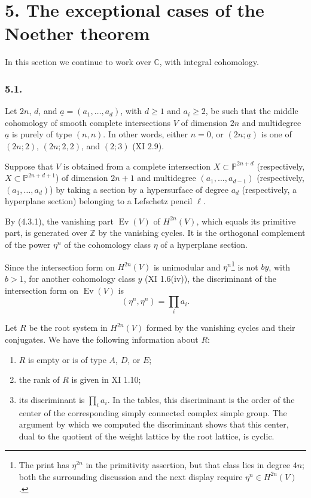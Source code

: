 \section*{5. The exceptional cases of the Noether theorem}

In this section we continue to work over $\mathbb C$, with integral
cohomology.

\subsubsection*{5.1.}
Let $2n$, $d$, and $\underline a=(a_1,\ldots,a_d)$, with $d\geq1$ and
$a_i\geq2$, be such that the middle cohomology of smooth complete
intersections $V$ of dimension $2n$ and multidegree $\underline a$ is
purely of type $(n,n)$.  In other words, either $n=0$, or
$(2n;\underline a)$ is one of $(2n;2)$, $(2n;2,2)$, and $(2;3)$
(XI 2.9).

Suppose that $V$ is obtained from a complete intersection
$X\subset\mathbb P^{2n+d}$ (respectively,
$X\subset\mathbb P^{2n+d+1}$) of dimension $2n+1$ and multidegree
$(a_1,\ldots,a_{d-1})$ (respectively, $(a_1,\ldots,a_d)$) by taking a
section by a hypersurface of degree $a_d$ (respectively, a hyperplane
section) belonging to a Lefschetz pencil $\ell$.

By (4.3.1), the vanishing part $\operatorname{Ev}(V)$ of $H^{2n}(V)$,
which equals its primitive part, is generated over $\mathbb Z$ by the
vanishing cycles.  It is the orthogonal complement of the power $\eta^n$
of the cohomology class $\eta$ of a hyperplane section.

Since the intersection form on $H^{2n}(V)$ is unimodular and
$\eta^n$\footnote{The print has $\eta^{2n}$ in the primitivity assertion,
but that class lies in degree $4n$; both the surrounding discussion and the
next display require $\eta^n\in H^{2n}(V)$.} is not $b y$, with $b>1$, for
another cohomology class $y$ (XI 1.6(iv)), the
discriminant of the intersection form on $\operatorname{Ev}(V)$ is
\[
 (\eta^n,\eta^n)=\prod_i a_i.
\]

Let $R$ be the root system in $H^{2n}(V)$ formed by the vanishing cycles
and their conjugates.  We have the following information about $R$:
\begin{enumerate}[label=(\alph*)]
\item $R$ is empty or is of type $A$, $D$, or $E$;
\item the rank of $R$ is given in XI 1.10;
\item its discriminant is $\prod_i a_i$.  In the tables, this discriminant
  is the order of the center of the corresponding simply connected complex
  simple group.  The argument by which we computed the discriminant shows
  that this center, dual to the quotient of the weight lattice by the root
  lattice, is cyclic.
\end{enumerate}

